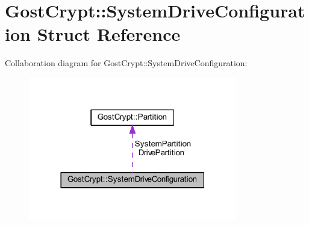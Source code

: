 \hypertarget{struct_gost_crypt_1_1_system_drive_configuration}{}\section{Gost\+Crypt\+:\+:System\+Drive\+Configuration Struct Reference}
\label{struct_gost_crypt_1_1_system_drive_configuration}


Collaboration diagram for Gost\+Crypt\+:\+:System\+Drive\+Configuration\+:
\nopagebreak
\begin{figure}[H]
\begin{center}
\leavevmode
\includegraphics[width=258pt]{struct_gost_crypt_1_1_system_drive_configuration__coll__graph}
\end{center}
\end{figure}
